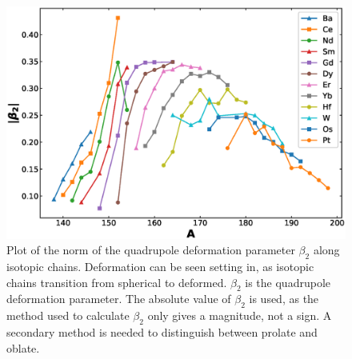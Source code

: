 \begin{figure}[!]
    \centering
    \includegraphics[scale=0.5]{Introduction_Figs/beta.eps}
    \caption{Plot of the norm of the quadrupole deformation parameter $\beta_2$ along isotopic chains. Deformation can be seen setting in, as isotopic chains transition from spherical to deformed. $\beta_2$ is the quadrupole deformation parameter. The absolute value of $\beta_2$ is used, as the method used to calculate $\beta_2$ only gives a magnitude, not a sign. A secondary method is needed to distinguish between prolate and oblate.}
    \label{fig:beta_by_isotope}
\end{figure}